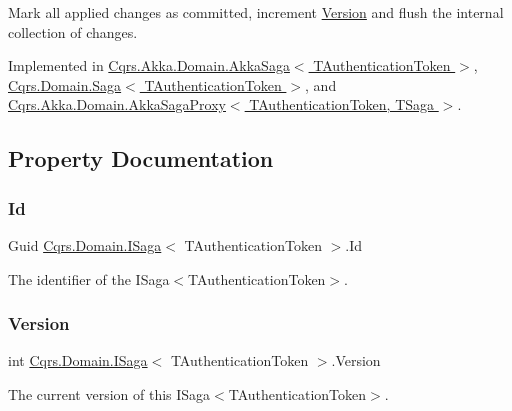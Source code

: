 Mark all applied changes as committed, increment \hyperlink{interfaceCqrs_1_1Domain_1_1ISaga_a83a02ff45543d670356dde4149cdc614_a83a02ff45543d670356dde4149cdc614}{Version} and flush the internal collection of changes. 



Implemented in \hyperlink{classCqrs_1_1Akka_1_1Domain_1_1AkkaSaga_a83269fac4653cca097461e924feaea7f_a83269fac4653cca097461e924feaea7f}{Cqrs.\+Akka.\+Domain.\+Akka\+Saga$<$ T\+Authentication\+Token $>$}, \hyperlink{classCqrs_1_1Domain_1_1Saga_a9caac842ea6e88d6e502b63ca1820fe4_a9caac842ea6e88d6e502b63ca1820fe4}{Cqrs.\+Domain.\+Saga$<$ T\+Authentication\+Token $>$}, and \hyperlink{classCqrs_1_1Akka_1_1Domain_1_1AkkaSagaProxy_a5a5c012bc0f7f957b8bd2298956ca9ae_a5a5c012bc0f7f957b8bd2298956ca9ae}{Cqrs.\+Akka.\+Domain.\+Akka\+Saga\+Proxy$<$ T\+Authentication\+Token, T\+Saga $>$}.



\subsection{Property Documentation}
\mbox{\label{interfaceCqrs_1_1Domain_1_1ISaga_aa470a39d3bcdc506dbd5bf49d127bc3c_aa470a39d3bcdc506dbd5bf49d127bc3c}} 
\subsubsection{\texorpdfstring{Id}{Id}}
{\footnotesize\ttfamily Guid \hyperlink{interfaceCqrs_1_1Domain_1_1ISaga}{Cqrs.\+Domain.\+I\+Saga}$<$ T\+Authentication\+Token $>$.Id\hspace{0.3cm}{\ttfamily [get]}}



The identifier of the I\+Saga$<$\+T\+Authentication\+Token$>$. 

\mbox{\label{interfaceCqrs_1_1Domain_1_1ISaga_a83a02ff45543d670356dde4149cdc614_a83a02ff45543d670356dde4149cdc614}} 
\subsubsection{\texorpdfstring{Version}{Version}}
{\footnotesize\ttfamily int \hyperlink{interfaceCqrs_1_1Domain_1_1ISaga}{Cqrs.\+Domain.\+I\+Saga}$<$ T\+Authentication\+Token $>$.Version\hspace{0.3cm}{\ttfamily [get]}}



The current version of this I\+Saga$<$\+T\+Authentication\+Token$>$. 


